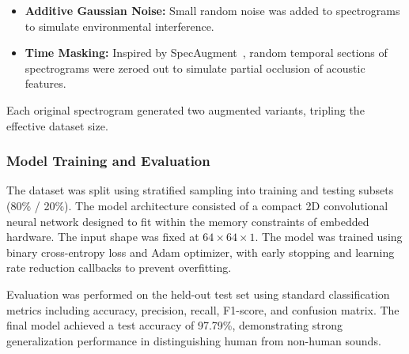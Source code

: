 \begin{itemize}
  \item \textbf{Additive Gaussian Noise:} Small random noise was added to spectrograms to simulate environmental interference.
  \item \textbf{Time Masking:} Inspired by SpecAugment~\cite{Park2019specaugment}, random temporal sections of spectrograms were zeroed out to simulate partial occlusion of acoustic features.
\end{itemize}

Each original spectrogram generated two augmented variants, tripling the effective dataset size.

\subsubsection{Model Training and Evaluation}
The dataset was split using stratified sampling into training and testing subsets (80\% / 20\%). The model architecture consisted of a compact 2D convolutional neural network designed to fit within the memory constraints of embedded hardware. The input shape was fixed at $64 \times 64 \times 1$. The model was trained using binary cross-entropy loss and Adam optimizer, with early stopping and learning rate reduction callbacks to prevent overfitting.

Evaluation was performed on the held-out test set using standard classification metrics including accuracy, precision, recall, F1-score, and confusion matrix. The final model achieved a test accuracy of 97.79\%, demonstrating strong generalization performance in distinguishing human from non-human sounds.